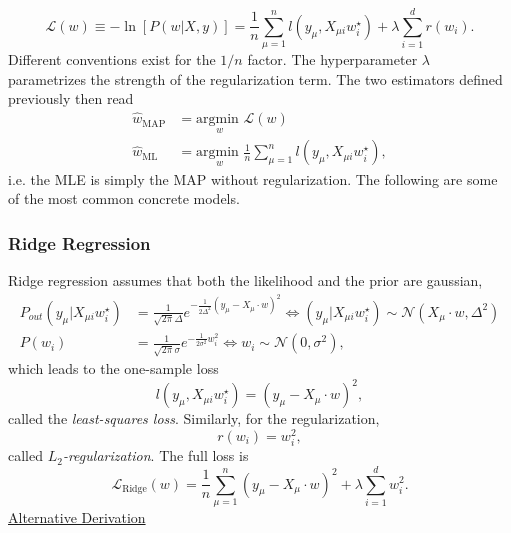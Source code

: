 \documentclass{article}
\begin{document}
\begin{equation}
    \boxed{
        \mathcal{L}(w)
        \equiv
        - \ln \left[P(w | X,y)\right]
        =
        \frac{1}{n}\sum_{\mu = 1}^{n} l(y_{\mu}, X_{\mu i} w^{\star}_i)
        +
        \lambda \sum_{i=1}^{d} r(w_i).
    }
\end{equation}
Different conventions exist for the $1/n$ factor. The hyperparameter $\lambda$ parametrizes the strength of the regularization term. The two estimators defined previously then read
\begin{align}
    \hat{w}_{\text{MAP}} &= \underset{w}{\text{argmin }} \mathcal{L}(w) \\
    \hat{w}_{\text{ML}} &= \underset{w}{\text{argmin }} \frac{1}{n}\sum_{\mu = 1}^{n} l(y_{\mu}, X_{\mu i} w^{\star}_i),
\end{align}
i.e. the MLE is simply the MAP without regularization. The following are some of the most common concrete models.
\subsubsection*{Ridge Regression}
Ridge regression assumes that both the likelihood and the prior are gaussian,
\begin{align}
    P_{out} (y_{\mu} | X_{\mu i} w^{\star}_i)
    &=
    \frac{1}{\sqrt{2\pi}\Delta}e^{-\frac{1}{2\Delta^2} (y_{\mu} - X_{\mu} \cdot w)^2}
    \iff \left(y_{\mu} | X_{\mu i} w^{\star}_i\right) \sim \mathcal{N}(X_{\mu}\cdot w,\Delta^2) \\
    P(w_i) &=
    \frac{1}{\sqrt{2\pi}\sigma}e^{-\frac{1}{2\sigma^2}w_i^2}
    \iff w_i \sim \mathcal{N}(0,\sigma^2),
\end{align}
which leads to the one-sample loss
\begin{equation}
    l(y_{\mu}, X_{\mu i} w^{\star}_i)
    =
    (y_{\mu} - X_{\mu} \cdot w)^2,
\end{equation}
called the \emph{least-squares loss}. Similarly, for the regularization,
\begin{equation}
    r(w_i)
    =
    w_i^2,
\end{equation}
called \emph{$L_2$-regularization}. The full loss is
\begin{equation}
    \mathcal{L}_{\text{Ridge}}(w)
    =
    \frac{1}{n}\sum_{\mu = 1}^{n} (y_{\mu} - X_{\mu} \cdot w)^2
    +
    \lambda \sum_{i=1}^{d} w_i^2.
\end{equation}
\underline{Alternative Derivation}
\end{document}
